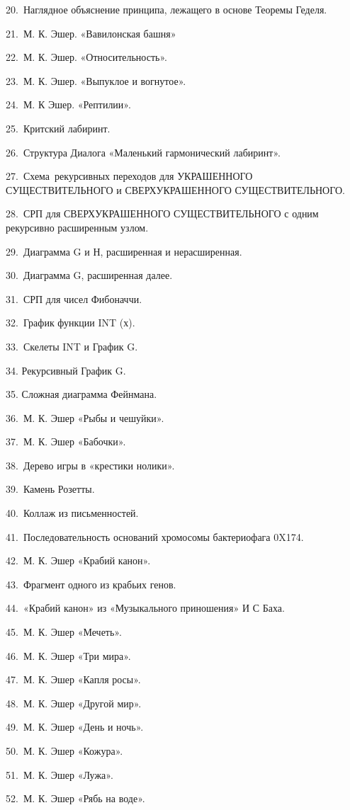 \documentclass[../main.tex]{subfiles}
\begin{document}
20.~Наглядное объяснение принципа, лежащего в основе Теоремы Геделя.

21.~М. К. Эшер. «Вавилонская башня»

22.~М. К. Эшер. «Относительность».

23.~М. К. Эшер. «Выпуклое и вогнутое».

24.~М. К Эшер. «Рептилии».

25.~Критский лабиринт.

26.~Структура Диалога «Маленький гармонический лабиринт».

27.~Схема~рекурсивных переходов для УКРАШЕННОГО СУЩЕСТВИТЕЛЬНОГО и СВЕРХУКРАШЕННОГО СУЩЕСТВИТЕЛЬНОГО.

28.~СРП для СВЕРХУКРАШЕННОГО СУЩЕСТВИТЕЛЬНОГО с одним рекурсивно расширенным узлом.

29.~Диаграмма G и Н, расширенная и нерасширенная.

30.~Диаграмма G, расширенная далее.

31.~СРП для чисел Фибоначчи.

32.~График функции INT (х).

33.~Скелеты INT и График G.

34. Рекурсивный График G.

35. Сложная диаграмма Фейнмана.

36.~М. К. Эшер «Рыбы и чешуйки».

37.~М. К. Эшер «Бабочки».

38.~Дерево игры в «крестики нолики».

39.~Камень Розетты.

40.~Коллаж из письменностей.

41.~Последовательность оснований хромосомы бактериофага 0X174.

42.~М. К. Эшер «Крабий канон».

43.~Фрагмент одного из крабьих генов.

44.~«Крабий канон» из «Музыкального приношения» И С Баха.

45.~М. К. Эшер «Мечеть».

46.~М. К. Эшер «Три мира».

47.~М. К. Эшер «Капля росы».

48.~М. К. Эшер «Другой мир».

49.~М. К. Эшер «День и ночь».

50.~М. К. Эшер «Кожура».

51.~М. К. Эшер «Лужа».

52.~М. К. Эшер «Рябь на воде».
\end{document}
